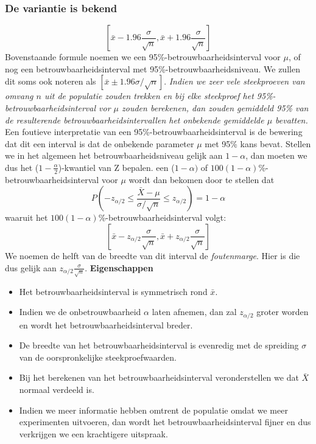 \documentclass[titlepage]{article}
\numberwithin{equation}{section}
\begin{document}
\subsubsection{De variantie is bekend}
\begin{equation}
	\left[ \bar{x}-1.96\frac{\sigma}{\sqrt{n}}, \bar{x}+1.96\frac{\sigma}{\sqrt{n}} \right]
	\label{6.4}
\end{equation}
Bovenstaande formule noemen we een 95\%-betrouwbaarheidsinterval voor $\mu$, of nog een betrouwbaarheidsinterval met 95\%-betrouwbaarheidsniveau. We zullen dit soms ook noteren als $[\bar{x}\pm 1.96\sigma/\sqrt{n}]$.\newline\newline
\emph{Indien we zeer vele steekproeven van omvang $n$ uit de populatie zouden trekken en bij elke steekproef het 95\%-betrouwbaarheidsinterval vor $\mu$ zouden berekenen, dan zouden gemiddeld 95\% van de resulterende betrouwbaarheidsintervallen het onbekende gemiddelde $\mu$ bevatten.}\newline\newline
\danger Een foutieve interpretatie van een 95\%-betrouwbaarheidsinterval is de bewering dat dit een interval is dat de onbekende parameter $\mu$ met 95\% kans bevat. \newline\newline
Stellen we in het algemeen het betrouwbaarheidsniveau gelijk aan $1 - \alpha$, dan moeten we dus het ($1-\frac{\alpha}{2}$)-kwantiel van Z bepalen. een ($1 - \alpha)$ of $100(1-\alpha)$\%-betrouwbaarheidsinterval voor $\mu$ wordt dan bekomen door te stellen dat
\begin{equation}
	P \left( -z_{\alpha / 2} \leq \frac{\bar{X} - \mu}{\sigma / \sqrt{n}}\leq z_{\alpha/2}\right) = 1-\alpha
	\label{6.5}
\end{equation}
waaruit het $100(1-\alpha)$\%-betrouwbaarheidsinterval volgt:
\begin{equation}
	\left[ \bar{x}-z_{\alpha/2}\frac{\sigma}{\sqrt{n}}, \bar{x} + z_{\alpha/2} \frac{\sigma}{\sqrt{n}}\right]
	\label{6.6}
\end{equation}
We noemen de helft van de breedte van dit interval de \textit{foutenmarge}. Hier is die dus gelijk aan $z_{\alpha/2}\frac{\sigma}{\sqrt{n}}$.\newline\newline
\textbf{Eigenschappen}
\begin{itemize}
	\item Het betrouwbaarheidsinterval is symmetrisch rond $\bar{x}$.
	\item Indien we de onbetrouwbaarheid $\alpha$ laten afnemen, dan zal $z_{\alpha/2}$ groter worden en wordt het betrouwbaarheidsinterval breder.
	\item De breedte van het betrouwbaarheidsinterval is evenredig met de spreiding $\sigma$ van de oorspronkelijke steekproefwaarden.
	\item Bij het berekenen van het betrouwbaarheidsinterval veronderstellen we dat $\bar{X}$ normaal verdeeld is. 
	\item Indien we meer informatie hebben omtrent de populatie omdat we meer experimenten uitvoeren, dan wordt het betrouwbaarheidsinterval fijner en dus verkrijgen we een krachtigere uitspraak.
\end{itemize}
\end{document}
